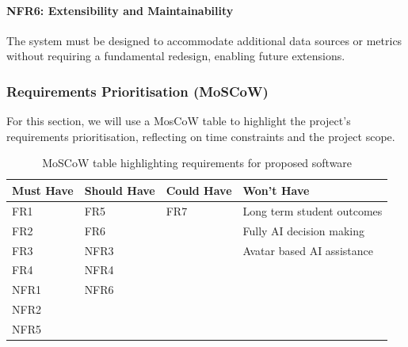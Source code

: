 \paragraph{NFR6: Extensibility and Maintainability}
The system must be designed to accommodate additional data sources or metrics without requiring a fundamental redesign, enabling future extensions.


\subsubsection{Requirements Prioritisation (MoSCoW)}
For this section, we will use a MosCoW table to highlight the project's requirements prioritisation, reflecting on time constraints and the project scope.



\begin{table}[H]
    \centering
    \begin{tabular}{|p{}|p{}|p{}|p{}|}
        \hline
        Must Have & Should Have & Could Have & Won't Have \\
        \hline
        \hline
        FR1& FR5 & FR7 & Long term student outcomes\\
        \hline
        FR2& FR6 &  & Fully AI decision making\\
        \hline
        FR3& NFR3 &  & Avatar based AI assistance\\
        \hline
        FR4& NFR4 &  & \\
        \hline
        NFR1& NFR6 &  & \\
        \hline
        NFR2&  &  & \\
        \hline
        NFR5&  &  & \\
        \hline

    \end{tabular}
    \caption{MoSCoW table highlighting requirements for proposed software}
    \label{tab: MosCoW}
\end{table}


